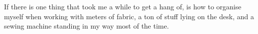 If there is one thing that took me a while to get a hang of, is how to organise myself when working with meters of fabric, a ton of stuff lying on the desk, and a sewing machine standing in my way most of the time.
